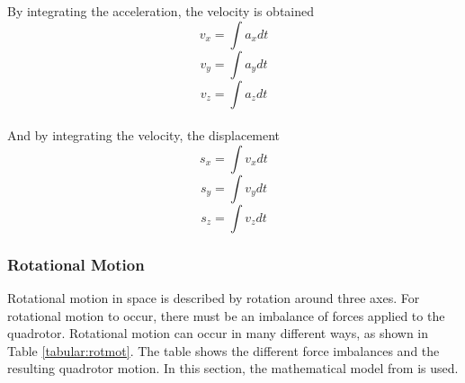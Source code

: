 By integrating the acceleration, the velocity is obtained
\begin{equation}
v_x = \int a_xdt
\end{equation}
\begin{equation}
v_y = \int a_ydt
\end{equation}
\begin{equation}
v_z = \int a_zdt
\end{equation}
\\
And by integrating the velocity, the displacement
\begin{equation}
s_x = \int v_xdt
\end{equation}
\begin{equation}
s_y = \int v_ydt
\end{equation}
\begin{equation}
s_z = \int v_zdt
\end{equation}
\clearpage

\subsubsection{Rotational Motion}
Rotational motion in space is described by rotation around three axes. For rotational motion to occur, there must be an imbalance of forces applied to the quadrotor. Rotational motion can occur in many different ways, as shown in Table \ref{tabular:rotmot}. The table shows the different force imbalances and the resulting quadrotor motion. In this section, the mathematical model from \cite{charlesdarwinuni} is used. \\\\

